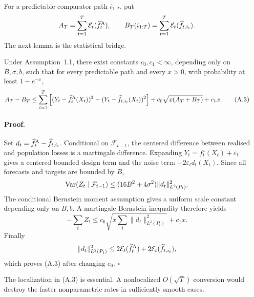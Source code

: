 For a predictable comparator path \(i_{1:T}\), put
\[
 A_T=\sum_{t=1}^T\mathcal E_t(\widehat f_t^{\rm A}),
 \qquad
 B_T(i_{1:T})
 =\sum_{t=1}^T\mathcal E_t(\widehat f_{t,i_t}).
\]
The next lemma is the statistical bridge.

\begin{lemma}
\label{lem:bridge}
Under Assumption~1.1, there exist constants \(c_0,c_1<\infty\), depending
only on \(B,\sigma,b\), such that for every predictable path and every \(x>0\),
with probability at least \(1-e^{-x}\),
\[
 A_T-B_T
 \le
 \sum_{t=1}^T
 \left[
 (Y_t-\widehat f_t^{\rm A}(X_t))^2
 -(Y_t-\widehat f_{t,i_t}(X_t))^2
 \right]
 +c_0\sqrt{x(A_T+B_T)}+c_1x.
 \tag{A.3}
\]
\end{lemma}

\paragraph{Proof.}
Set \(d_t=\widehat f_t^{\rm A}-\widehat f_{t,i_t}\).  Conditional on
\(\mathcal F_{t-1}\), the centered difference between realised and population
losses is a martingale difference.  Expanding
\(Y_t=f_t^\star(X_t)+\varepsilon_t\) gives a centered bounded design term and
the noise term \(-2\varepsilon_td_t(X_t)\).  Since all forecasts and targets
are bounded by \(B\),
\[
 {\rm Var}(Z_t\mid\mathcal F_{t-1})
 \le
 (16B^2+4\sigma^2)\|d_t\|_{L^2(P_t)}^2.
\]
The conditional Bernstein moment assumption gives a uniform scale constant
depending only on \(B,b\).  A martingale Bernstein inequality therefore yields
\[
 -\sum_t Z_t
 \le
 c_0\sqrt{x\sum_t\|d_t\|_{L^2(P_t)}^2}+c_1x.
\]
Finally
\[
 \|d_t\|_{L^2(P_t)}^2
 \le
 2\mathcal E_t(\widehat f_t^{\rm A})
 +2\mathcal E_t(\widehat f_{t,i_t}),
\]
which proves (A.3) after changing \(c_0\). \(\square\)

The localization in (A.3) is essential.  A nonlocalized
\(O(\sqrt{T})\) conversion would destroy the faster nonparametric rates in
sufficiently smooth cases.

